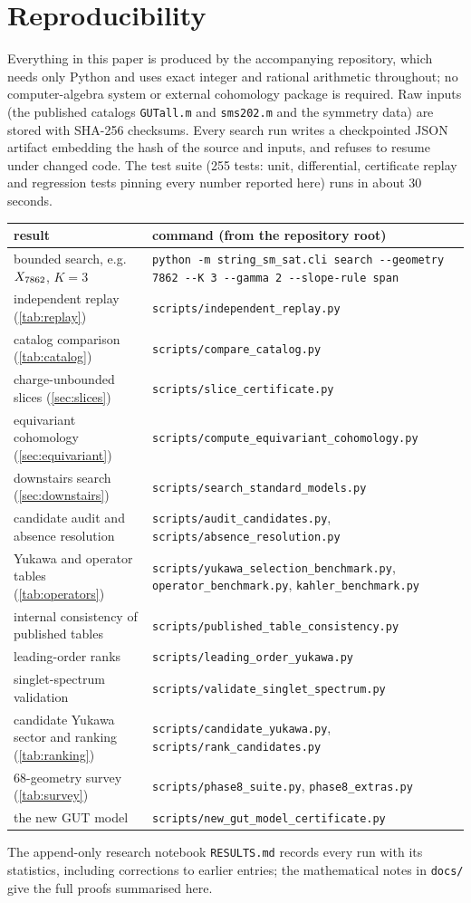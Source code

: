 \section{Reproducibility}
\label{app:reproducibility}

Everything in this paper is produced by the accompanying repository, which needs
only Python and uses exact integer and rational arithmetic throughout; no
computer-algebra system or external cohomology package is required. Raw inputs
(the published catalogs \texttt{GUTall.m} and \texttt{sms202.m} and the symmetry
data) are stored with SHA-256 checksums. Every search run writes a checkpointed
JSON artifact embedding the hash of the source and inputs, and refuses to resume
under changed code. The test suite (255 tests: unit, differential, certificate
replay and regression tests pinning every number reported here) runs in about
30 seconds.

\begin{center}\small
\begin{tabular}{@{}p{}p{}@{}}
\toprule
result & command (from the repository root) \\
\midrule
bounded search, e.g.\ $X_{7862}$, $K=3$ &
\texttt{python -m string\_sm\_sat.cli search -{}-geometry 7862 -{}-K 3 -{}-gamma 2 -{}-slope-rule span} \\
independent replay (\cref{tab:replay}) & \texttt{scripts/independent\_replay.py} \\
catalog comparison (\cref{tab:catalog}) & \texttt{scripts/compare\_catalog.py} \\
charge-unbounded slices (\cref{sec:slices}) & \texttt{scripts/slice\_certificate.py} \\
equivariant cohomology (\cref{sec:equivariant}) & \texttt{scripts/compute\_equivariant\_cohomology.py} \\
downstairs search (\cref{sec:downstairs}) & \texttt{scripts/search\_standard\_models.py} \\
candidate audit and absence resolution & \texttt{scripts/audit\_candidates.py}, \texttt{scripts/absence\_resolution.py} \\
Yukawa and operator tables (\cref{tab:operators}) & \texttt{scripts/yukawa\_selection\_benchmark.py}, \texttt{operator\_benchmark.py}, \texttt{kahler\_benchmark.py} \\
internal consistency of published tables & \texttt{scripts/published\_table\_consistency.py} \\
leading-order ranks & \texttt{scripts/leading\_order\_yukawa.py} \\
singlet-spectrum validation & \texttt{scripts/validate\_singlet\_spectrum.py} \\
candidate Yukawa sector and ranking (\cref{tab:ranking}) & \texttt{scripts/candidate\_yukawa.py}, \texttt{scripts/rank\_candidates.py} \\
68-geometry survey (\cref{tab:survey}) & \texttt{scripts/phase8\_suite.py}, \texttt{phase8\_extras.py} \\
the new GUT model & \texttt{scripts/new\_gut\_model\_certificate.py} \\
\bottomrule
\end{tabular}
\end{center}

The append-only research notebook \texttt{RESULTS.md} records every run with its
statistics, including corrections to earlier entries; the mathematical notes in
\texttt{docs/} give the full proofs summarised here.
